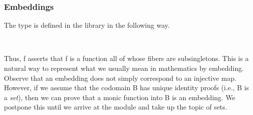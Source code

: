 \subsubsection{Embeddings}\label{embeddings}


The  type is defined in the \typetopology library in the following way.
\ccpad
\begin{code}%
\>[1]\AgdaSpace{}%
\AgdaSymbol{:}\AgdaSpace{}%
\AgdaSymbol{(}\AgdaSpace{}%
\AgdaSpace{}%
\AgdaSymbol{)}\AgdaSpace{}%
\AgdaSpace{}%
\AgdaSpace{}%
\AgdaSpace{}%
\AgdaSpace{}%
\<%
\\
%
\>[1]\AgdaSpace{}%
\AgdaSpace{}%
\AgdaSymbol{=}\AgdaSpace{}%
\AgdaSpace{}%
\AgdaSpace{}%
\AgdaSpace{}%
\AgdaSpace{}%
\AgdaSymbol{(}\AgdaSpace{}%
\AgdaSpace{}%
\AgdaSymbol{)}\<%
\end{code}
\ccpad
Thus,  \ab f asserts that \ab f is a function all of whose fibers are subsingletons. This is a natural way to represent what we usually mean in mathematics by embedding. Observe that an embedding does not simply correspond to an injective map. However, if we assume that the codomain \ab B has unique identity proofs (i.e., \ab B is a \emph{set}), then we can prove that a monic function into \ab B is an embedding. We postpone this until we arrive at the  module and take up the topic of sets.

